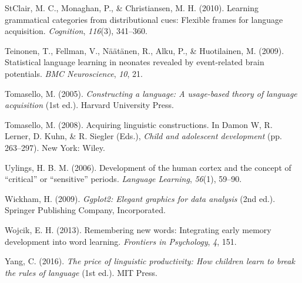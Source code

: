 \documentclass[man,mask,floatsintext]{apa6}
\begin{document}
\hypertarget{ref-clair2010learning}{}
StClair, M. C., Monaghan, P., \& Christiansen, M. H. (2010). Learning
grammatical categories from distributional cues: Flexible frames for
language acquisition. \emph{Cognition}, \emph{116}(3), 341--360.

\hypertarget{ref-teinonen2009statistical}{}
Teinonen, T., Fellman, V., Näätänen, R., Alku, P., \& Huotilainen, M.
(2009). Statistical language learning in neonates revealed by
event-related brain potentials. \emph{BMC Neuroscience}, \emph{10}, 21.

\hypertarget{ref-tomasello2003constructing}{}
Tomasello, M. (2005). \emph{Constructing a language: A usage-based
theory of language acquisition} (1st ed.). Harvard University Press.

\hypertarget{ref-tomasello2006acquiring}{}
Tomasello, M. (2008). Acquiring linguistic constructions. In Damon W, R.
Lerner, D. Kuhn, \& R. Siegler (Eds.), \emph{Child and adolescent
development} (pp. 263--297). New York: Wiley.

\hypertarget{ref-uylings2006development}{}
Uylings, H. B. M. (2006). Development of the human cortex and the
concept of ``critical'' or ``sensitive'' periods. \emph{Language
Learning}, \emph{56}(1), 59--90.

\hypertarget{ref-ggplot2}{}
Wickham, H. (2009). \emph{Ggplot2: Elegant graphics for data analysis}
(2nd ed.). Springer Publishing Company, Incorporated.

\hypertarget{ref-wojcik2013remembering}{}
Wojcik, E. H. (2013). Remembering new words: Integrating early memory
development into word learning. \emph{Frontiers in Psychology},
\emph{4}, 151.

\hypertarget{ref-yang2016price}{}
Yang, C. (2016). \emph{The price of linguistic productivity: How
children learn to break the rules of language} (1st ed.). MIT Press.

\endgroup
\end{document}
